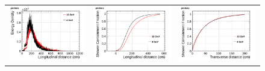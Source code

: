 \begin{figure}[htp]
\begin{tabular}{ccc}
    \includegraphics[scale=0.15]{figures/protons_density_overlay}&
    \includegraphics[scale=0.15]{figures/protons_lcont_overlay}&
    \includegraphics[scale=0.15]{figures/protons_wcont_overlay}\\
 

\end{tabular}
\end{figure}

